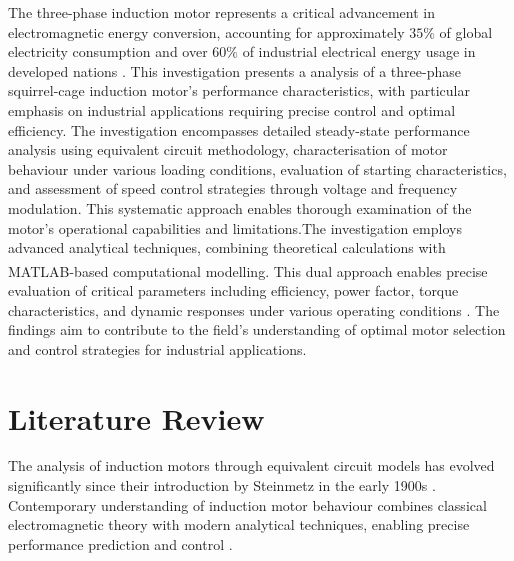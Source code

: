 \documentclass[a4paper,12pt]{article}
\begin{document}
The three-phase induction motor represents a critical advancement in electromagnetic energy conversion, accounting for approximately $35\%$ of global electricity consumption \cite{waide2011} and over $60\%$ of industrial electrical energy usage in developed nations \cite{almeida2014}. This investigation presents a analysis of a three-phase squirrel-cage induction motor's performance characteristics, with particular emphasis on industrial applications requiring precise control and optimal efficiency. The investigation encompasses detailed steady-state performance analysis using equivalent circuit methodology, characterisation of motor behaviour under various loading conditions, evaluation of starting characteristics, and assessment of speed control strategies through voltage and frequency modulation. This systematic approach enables thorough examination of the motor's operational capabilities and limitations.The investigation employs advanced analytical techniques, combining theoretical calculations with MATLAB\textsuperscript{\textregistered}-based computational modelling. This dual approach enables precise evaluation of critical parameters including efficiency, power factor, torque characteristics, and dynamic responses under various operating conditions \cite{fitzgerald2020}. The findings aim to contribute to the field's understanding of optimal motor selection and control strategies for industrial applications.

 
\section{Literature Review}
\label{sec:literature}

The analysis of induction motors through equivalent circuit models has evolved significantly since their introduction by Steinmetz in the early 1900s \cite{fitzgerald2020}. Contemporary understanding of induction motor behaviour combines classical electromagnetic theory with modern analytical techniques, enabling precise performance prediction and control \cite{chapman2021}.
\end{document}
